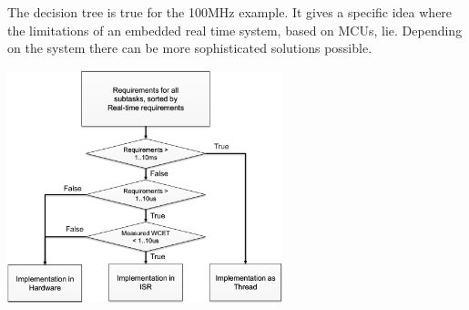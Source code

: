 The decision tree is true for the 100\;MHz example.
It gives a specific idea where the limitations of an embedded real time system, based on MCUs, lie.
Depending on the system there can be more sophisticated solutions possible.

\includegraphics[width=0.6\textwidth]{images/DesignStrategy/decision_tree.png}